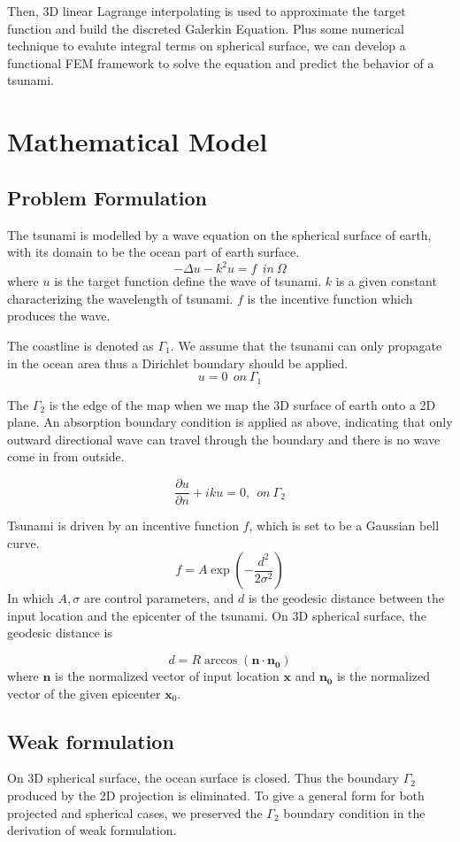 \documentclass[a4paper]{article}
\renewcommand{\vec}[1]{\mathbf{#1}}
\begin{document}
Then, 3D linear Lagrange interpolating is used to approximate the target function and build the discreted Galerkin Equation.
Plus some numerical technique to evalute integral terms on spherical surface\cite{giraldo1997lagrange}, we can develop a functional FEM framework to solve the equation and predict the behavior of a tsunami.

\section{Mathematical Model}
\subsection{Problem Formulation}
The tsunami is modelled by a wave equation on the spherical surface of earth, with its domain to be the ocean part of earth surface. 
\[ -\Delta u - k^{2} u = f \ \ in \  \Omega\]
where $u$ is the target function define the wave of tsunami. $k$ is a given constant characterizing the 
wavelength of tsunami. $f$ is the incentive function which produces the wave.

The coastline is denoted as $\Gamma_1$. We assume that the tsunami can only propagate in the ocean
area thus a Dirichlet boundary should be applied. 
\[ u = 0 \ \ on \ \Gamma_{1}\]

The $\Gamma_2$ is the edge of the map when we map the 3D 
surface of earth onto a 2D plane. An absorption boundary condition is applied as above, indicating that only outward directional wave can travel through the boundary and there is no wave come in from outside.

\[ \frac{\partial u}{\partial n} + iku = 0, \ \ on \ \Gamma_{2} \]

Tsunami is driven by an incentive function $f$, which is set to be a Gaussian bell curve.
\[
f=A\exp\left(-\frac{d^2}{2\sigma^2} \right)   
\]
    In which $A,\sigma$ are control parameters, and $d$ is the geodesic distance between the input location and
the epicenter of the tsunami. On 3D spherical surface, the geodesic distance is  

\[
    d = R \arccos (\vec{n} \cdot \vec{n_0})
\]
where $\vec{n}$ is the normalized vector of input location $\vec{x}$ and $\vec{n_0}$ 
is the normalized vector of the given epicenter $\vec{x}_0$.

\subsection{Weak formulation}
On 3D spherical surface, the ocean surface is closed. 
Thus the boundary \(\Gamma_2\) produced by the 2D projection is eliminated.
To give a general form for both projected and spherical cases, we preserved the $\Gamma_2$ boundary condition
in the derivation of weak formulation.
\end{document}
